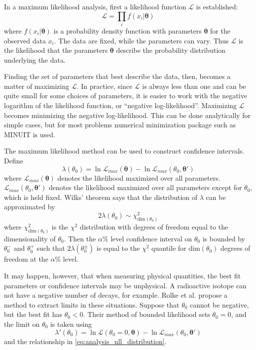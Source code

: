 \documentclass[herrin-thesis.tex]{subfiles}
\begin{document}
In a maximum likelihood analysis, first a likelihood function \(\mathcal{L}\) is established:
\begin{equation}
\mathcal{L} = \prod_i f(x_i|\boldsymbol{\theta})
\end{equation}
where \(f(x_i|\boldsymbol{\theta})\) is a probability density function with parameters \(\boldsymbol{\theta}\) for the observed data \(x_i\). The data are fixed, while the parameters can vary. Thus \(\mathcal{L}\) is the likelihood that the parameters \(\boldsymbol{\theta}\) describe the probability distribution underlying the data.

Finding the set of parameters that best describe the data, then, becomes a matter of maximizing \(\mathcal{L}\). In practice, since \(\mathcal{L}\) is always less than one and can be quite small for some choices of parameters, it is easier to work with the negative logarithm of the likelihood function, or ``negative log-likelihood''. Maximizing \(\mathcal{L}\) becomes minimizing the negative log-likelihood. This can be done analytically for simple cases, but for most problems numerical minimization package such as MINUIT\cite{James:1975kx} is used.

The maximum likelihood method can be used to construct confidence intervals. Define
\begin{equation}
\lambda({\theta_0}) = \ln \mathcal{L}_{max}(\boldsymbol{\theta}) - \ln \mathcal{L}_{max}(\theta_0, \boldsymbol{\theta}')
\end{equation}
where \(\mathcal{L}_{max}(\boldsymbol{\theta})\) denotes the likelihood maximized over all parameters. \(\mathcal{L}_{max}(\theta_0, \boldsymbol{\theta}')\) denotes the likelihood maximized over all parameters except for \(\theta_0\), which is held fixed. Wilks' theorem says that the distribution of \(\lambda\) can be approximated by
\begin{equation}
2\lambda(\theta_0) \sim \chi^2_{\text{dim}(\theta_0)}
\label{eq:analysis_nll_distribution}
\end{equation}
where \(\chi^2_{\text{dim}(\theta_0)}\) is the \(\chi^2\) distribution with degrees of freedom equal to the dimensionality of \(\theta_0\). Then the \(\alpha\%\) level confidence interval on \(\theta_0\) is bounded by \(\theta_0^-\) and \(\theta_0^+\) such that \(2\lambda(\theta_0^\pm)\) is equal to the \(\chi^2\) quantile for \(\text{dim}(\theta_0)\) degrees of freedom at the \(\alpha\%\) level.

It may happen, however, that when measuring physical quantities, the best fit parameters or confidence intervals may be unphysical. A radioactive isotope can not have a negative number of decays, for example. Rolke et al.\cite{Rolke:2005uq} propose a method to extract limits in these situations. Suppose that \(\theta_0\) cannot be negative, but the best fit has \(\theta_0 < 0\). Their method of bounded likelihood sets \(\theta_0 = 0\), and the limit on \(\theta_0\) is taken using
\begin{equation}
\lambda'({\theta_0}) = \ln \mathcal{L}(\theta_0 = 0, \boldsymbol{\theta}) - \ln \mathcal{L}_{max}(\theta_0, \boldsymbol{\theta}')
\end{equation}
and the relationship in \cref{eq:analysis_nll_distribution}.
\end{document}
